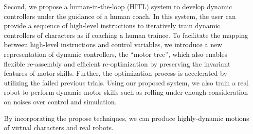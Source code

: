 \begin{summary}
  Second, we propose a human-in-the-loop (HITL) system to develop dynamic
  controllers under the guidance of a human coach.
  In this system, the user can provide a sequence of high-level instructions
  to iteratively train dynamic controllers of characters 
  as if coaching a human trainee.
  To facilitate the mapping between high-level instructions and
  control variables, we introduce a new representation of dynamic controllers,
  the ``motor tree'', which also enables flexible re-assembly and 
  efficient re-optimization by preserving the invariant features
  of motor skills.
  Further, the optimization process is accelerated by 
  utilizing the failed previous trials.
  Using our proposed system, we also train a real robot to perform
  dynamic motor skills such as rolling under enough consideration 
  on noises over control and simulation.

  By incorporating the propose techniques, we can produce highly-dynamic motions 
  of virtual characters and real robots.


\end{summary}
